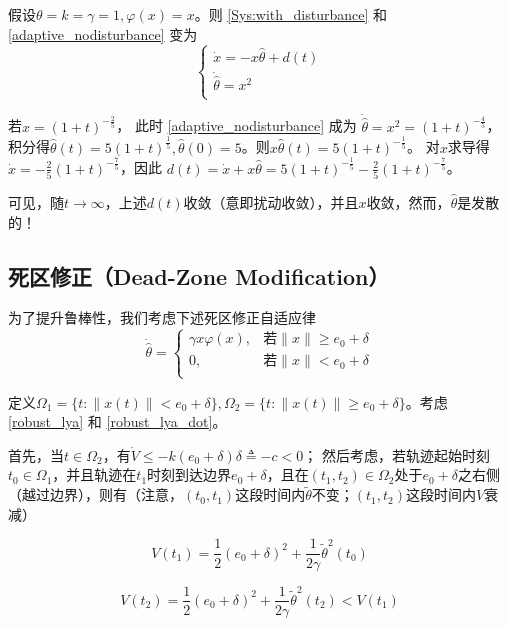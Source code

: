 \begin{example}[扰动衰减但参数估计发散]
    假设\(\theta = k = \gamma = 1,\varphi(x) = x\)。则 \eqref{Sys:with_disturbance} 和 \eqref{adaptive_nodisturbance} 变为
\[\begin{cases}
\dot{x} = - x\hat{\theta} + d(t) \\
\dot{\hat{\theta}} = x^{2} \\
\end{cases}\]

若$x = (1 + t)^{- \frac{2}{5}} $，
此时 \eqref{adaptive_nodisturbance} 成为
$\dot{\hat{\theta}} = x^{2} = (1 + t)^{- \frac{4}{5}} $，
积分得$\hat{\theta}(t) = 5(1 + t)^{\frac{1}{5}},\hat{\theta}(0) = 5$。则\(x\hat{\theta}(t) = 5(1 + t)^{- \frac{1}{5}}\)。
对$x$求导得$\dot{x} = - \frac{2}{5}(1 + t)^{- \frac{7}{5}}$，因此
$d(t) = \dot{x} + x\hat{\theta} = 5(1 + t)^{- \frac{1}{5}} - \frac{2}{5}(1 + t)^{- \frac{7}{5}}$。

可见，随$t\to\infty$，上述\(d(t)\)收敛（意即扰动收敛），并且\(x\)收敛，然而，\(\hat{\theta}\)是发散的！
\end{example}

\subsection{死区修正（Dead-Zone Modification）}

为了提升鲁棒性，我们考虑下述死区修正自适应律
\[\dot{\hat{\theta}} = \left\{\begin{matrix}
\gamma x\varphi(x), & \text{若} \| x \| \geq e_{0} + \delta \\
0, & \text{若} \| x \| < e_{0} + \delta \\
\end{matrix}\right.\]

定义\(\Omega_{1} = \{ t: \| x(t) \| < e_{0} + \delta\},\Omega_{2} = \{ t: \| x(t) \| \geq e_{0} + \delta\}\)。考虑\eqref{robust_lya} 和 \eqref{robust_lya_dot}。

首先，当\(t \in \Omega_{2}\)，有\(\dot{V} \leq - k(e_{0} + \delta)\delta \triangleq - c < 0\)；
然后考虑，若轨迹起始时刻\(t_{0} \in \Omega_{1}\)，并且轨迹在\(t_{1}\)时刻到达边界\(e_{0} + \delta\)，且在\((t_{1},t_{2}) \in \Omega_{2}\)处于\(e_{0} + \delta\)之右侧（越过边界），则有（注意，$(t_0,t_1)$这段时间内$\tilde{\theta}$不变；$(t_1,t_2)$这段时间内$V$衰减）

\[V(t_{1}) = \frac{1}{2}(e_{0} + \delta)^{2} + \frac{1}{2\gamma}{\tilde{\theta}}^{2}(t_{0})\]

\[V(t_{2}) = \frac{1}{2}(e_{0} + \delta)^{2} + \frac{1}{2\gamma}{\tilde{\theta}}^{2}(t_{2}) < V(t_{1})\]

